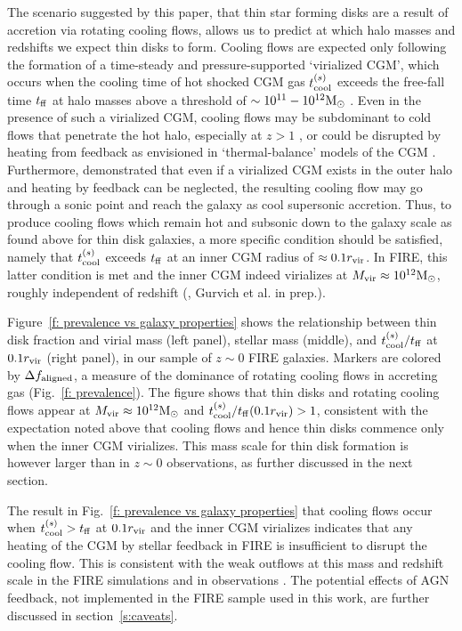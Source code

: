 \documentclass[fleqn,usenatbib]{mnras}
\newcommand{\Rvir}{r_{\rm vir}}
\newcommand{\msun}{{\rm M}_\odot}
\begin{document}
The scenario suggested by this paper, that thin star forming disks are a result of accretion via rotating cooling flows, allows us to predict at which halo masses and redshifts we expect thin disks to form.
Cooling flows are expected only following the formation of a time-steady and pressure-supported `virialized CGM', which occurs when the cooling time of hot shocked CGM gas $t_{\rm cool}^{(s)}$ exceeds the free-fall time $t_{\rm ff}$ at halo masses above a threshold of $\sim10^{11}-10^{12}\msun$ \citep{White1978, White1991, Birnboim2003}. 
Even in the presence of such a virialized CGM, cooling flows may be subdominant to cold flows that penetrate the hot halo, especially at $z>1$ \cite[e.g.,][]{Keres2005,Dekel2006, Dekel2009}, or could be disrupted by heating from feedback as envisioned in `thermal-balance'  models of the CGM \citep[e.g.,][]{Mccourt2012, Sharma2012, Voit2017, Faerman2017, Faerman2020}.
Furthermore, \cite{Stern2019} demonstrated that even if a virialized CGM exists in the outer halo and heating by feedback can be neglected, the resulting cooling flow may go through a sonic point and reach the galaxy as cool supersonic accretion.
Thus, to produce cooling flows which remain hot and subsonic down to the galaxy scale as found above for thin disk galaxies, a more specific condition should be satisfied, namely that $t_{\rm cool}^{(s)}$ exceeds $t_{\rm ff}$ at an inner CGM radius of $\approx0.1 r_{\rm vir}$.
In FIRE, this latter condition is met and the inner CGM indeed virializes at $\Mvir\approx10^{12}\msun$, roughly independent of redshift (\citealt{Stern2021}, Gurvich et al. in prep.).

Figure~\ref{f: prevalence vs galaxy properties} shows the relationship between thin disk fraction and virial mass (left panel), stellar mass (middle), and $t_{\rm cool}^{(s)}/t_{\rm ff}$ at $0.1 r_{\rm vir}$ (right panel), in our sample of $z\sim0$ FIRE galaxies.
Markers are colored by $\Delta f_{\rm aligned}$, a measure of the dominance of rotating cooling flows in accreting gas (Fig.~\ref{f: prevalence}).
The figure shows that thin disks and rotating cooling flows appear at $M_{\rm vir}\approx 10^{12}\msun$ and $\tcoolsh/\tff(0.1\Rvir)>1$, consistent with the expectation noted above that cooling flows and hence thin disks commence only when the inner CGM virializes.
This mass scale for thin disk formation is however larger than in $z\sim0$ observations, as further discussed in the next section.

The result in Fig.~\ref{f: prevalence vs galaxy properties} that cooling flows occur when $t_{\rm cool}^{(s)}>t_{\rm ff}$ at $0.1\Rvir$ and the inner CGM virializes indicates that any heating of the CGM by stellar feedback in FIRE is insufficient to disrupt the cooling flow.
This is consistent with the weak outflows at this mass and redshift scale in the FIRE simulations \citep{Muratov2015, Muratov2017, Stern2021, Pandya2021} and in observations \citep[e.g.,][]{Heckman2019}.
The potential effects of AGN feedback, not implemented in the FIRE sample used in this work, are further discussed in section~\ref{s:caveats}. 
\end{document}
